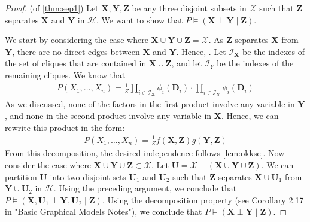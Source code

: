 \documentclass{article}
\begin{document}
\begin{proof} (of \cref{thm:sep1})
 Let $\boldsymbol{X}, \boldsymbol{Y}, \boldsymbol{Z}$ be any three disjoint subsets in $\mathcal{X}$ such that $\boldsymbol{Z}$ separates $\boldsymbol{X}$ and $\boldsymbol{Y}$ in $\mathcal{H}$. We want to show that $P \models(\boldsymbol{X} \perp \boldsymbol{Y} \mid \boldsymbol{Z})$.

We start by considering the case where $\boldsymbol{X} \cup \boldsymbol{Y} \cup \boldsymbol{Z}=\mathcal{X}$. As $\boldsymbol{Z}$ separates $\boldsymbol{X}$ from $\boldsymbol{Y}$, there are no direct edges between $\boldsymbol{X}$ and $\boldsymbol{Y}$. Hence, . Let $\mathcal{I}_{\boldsymbol{X}}$ be the indexes of the set of cliques that are contained in $\boldsymbol{X} \cup \boldsymbol{Z}$, and let $\mathcal{I}_{Y}$ be the indexes of the remaining cliques. We know that
\begin{align*}
P\left(X_{1}, \ldots, X_{n}\right)=\frac{1}{Z} \prod_{i \in \mathcal{I}_{\boldsymbol{X}}} \phi_{i}\left(\boldsymbol{D}_{i}\right) \cdot \prod_{i \in \mathcal{I}_{\boldsymbol{Y}}} \phi_{i}\left(\boldsymbol{D}_{i}\right)
\end{align*}
As we discussed, none of the factors in the first product involve any variable in $\boldsymbol{Y}$, and none in the second product involve any variable in $\boldsymbol{X}$. Hence, we can rewrite this product in the form:
\begin{align*}
P\left(X_{1}, \ldots, X_{n}\right)=\frac{1}{Z} f(\boldsymbol{X}, \boldsymbol{Z}) g(\boldsymbol{Y}, \boldsymbol{Z})
\end{align*}
From this decomposition, the desired independence follows \cref{lem:okkse}.
Now consider the case where $\boldsymbol{X} \cup \boldsymbol{Y} \cup \boldsymbol{Z} \subset \mathcal{X}$. Let $\boldsymbol{U}=\mathcal{X}-(\boldsymbol{X} \cup \boldsymbol{Y} \cup \boldsymbol{Z})$. We can partition $\boldsymbol{U}$ into two disjoint sets $\boldsymbol{U}_{1}$ and $\boldsymbol{U}_{2}$ such that $\boldsymbol{Z}$ separates $\boldsymbol{X} \cup \boldsymbol{U}_{1}$ from $\boldsymbol{Y} \cup \boldsymbol{U}_{2}$ in $\mathcal{H}$. Using the preceding argument, we conclude that $P \models\left(\boldsymbol{X}, \boldsymbol{U}_{1} \perp \boldsymbol{Y}, \boldsymbol{U}_{2} \mid \boldsymbol{Z}\right)$. Using the decomposition property (see Corollary 2.17 in "Basic Graphical Models Notes"), we conclude that $P \models(\boldsymbol{X} \perp \boldsymbol{Y} \mid \boldsymbol{Z})$.
\end{proof}
\end{document}
